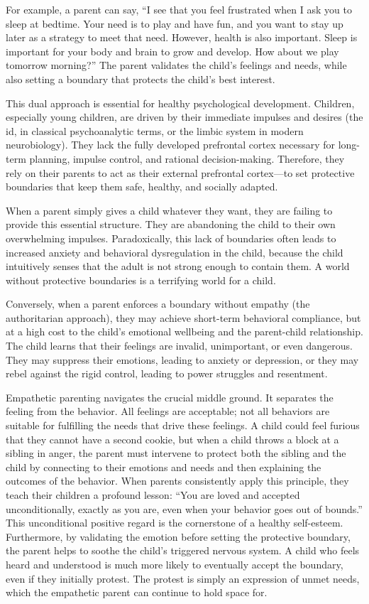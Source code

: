 For example, a parent can say, ``I see that you feel frustrated when I ask you to sleep at bedtime. 
Your need is to play and have fun, and you want to stay up later as a strategy to meet that need. 
However, health is also important.
Sleep is important for your body and brain to grow and develop. 
How about we play tomorrow morning?''
The parent validates the child's feelings and needs, while also setting a boundary that protects the child's best interest.

This dual approach is essential for healthy psychological development.
Children, especially young children, are driven by their immediate impulses and desires (the id, in classical psychoanalytic terms, or the limbic system in modern neurobiology).
They lack the fully developed prefrontal cortex necessary for long-term planning, impulse control, and rational decision-making.
Therefore, they rely on their parents to act as their external prefrontal cortex---to set protective boundaries that keep them safe, healthy, and socially adapted.

When a parent simply gives a child whatever they want, they are failing to provide this essential structure.
They are abandoning the child to their own overwhelming impulses.
Paradoxically, this lack of boundaries often leads to increased anxiety and behavioral dysregulation in the child, because the child intuitively senses that the adult is not strong enough to contain them.
A world without protective boundaries is a terrifying world for a child.

Conversely, when a parent enforces a boundary without empathy (the authoritarian approach), they may achieve short-term behavioral compliance, but at a high cost to the child's emotional wellbeing and the parent-child relationship.
The child learns that their feelings are invalid, unimportant, or even dangerous.
They may suppress their emotions, leading to anxiety or depression, or they may rebel against the rigid control, leading to power struggles and resentment.

Empathetic parenting navigates the crucial middle ground.
It separates the feeling from the behavior.
All feelings are acceptable; not all behaviors are suitable for fulfilling the needs that drive these feelings.
A child could feel furious that they cannot have a second cookie, but when a child throws a block at a sibling in anger, the parent must intervene to protect both the sibling and the child by connecting to their emotions and needs and then explaining the outcomes of the behavior.
When parents consistently apply this principle, they teach their children a profound lesson: ``You are loved and accepted unconditionally, exactly as you are, even when your behavior goes out of bounds.''
This unconditional positive regard is the cornerstone of a healthy self-esteem.
Furthermore, by validating the emotion before setting the protective boundary, the parent helps to soothe the child's triggered nervous system.
A child who feels heard and understood is much more likely to eventually accept the boundary, even if they initially protest.
The protest is simply an expression of unmet needs, which the empathetic parent can continue to hold space for.

